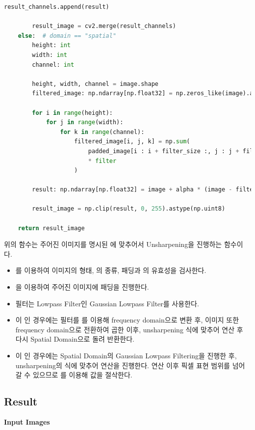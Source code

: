 \documentclass{report}
\begin{document}
\begin{lstlisting}[language=Python, caption=unsharpMasking, firstnumber=282]
            result_channels.append(result)

        result_image = cv2.merge(result_channels)
    else:  # domain == "spatial"
        height: int
        width: int
        channel: int

        height, width, channel = image.shape
        filtered_image: np.ndarray[np.float32] = np.zeros_like(image).astype(np.float32)

        for i in range(height):
            for j in range(width):
                for k in range(channel):
                    filtered_image[i, j, k] = np.sum(
                        padded_image[i : i + filter_size :, j : j + filter_size, k]
                        * filter
                    )

        result: np.ndarray[np.float32] = image + alpha * (image - filtered_image)

        result_image = np.clip(result, 0, 255).astype(np.uint8)

    return result_image
\end{lstlisting}

위의 함수는 주어진 이미지를 명시된 에 맞추어서 Unsharpening을 진행하는 함수이다.

\begin{itemize}
    \item {}를 이용하여 이미지의 형태, 의 종류, 패딩과 의 유효성을 검사한다.
    \item {}을 이용하여 주어진 이미지에 패딩을 진행한다.
    \item 필터는 Lowpass Filter인 Gaussian Lowpass Filter를 사용한다.
    \item {}이 인 경우에는 필터를 를 이용해 frequency domain으로 변환 후, 이미지 또한 frequency domain으로 전환하여 곱한 이후, unsharpening 식에 맞추어 연산 후 다시 Spatial Domain으로 돌려 반환한다.
    \item {}이 인 경우에는 Spatial Domain의 Gaussian Lowpass Filtering을 진행한 후, unsharpening의 식에 맞추어 연산을 진행한다. 연산 이후 픽셀 표현 범위를 넘어갈 수 있으므로 를 이용해 값을 절삭한다.
\end{itemize}

\subsection*{Result}

\noindent\textbf{Input Images}
\end{document}
